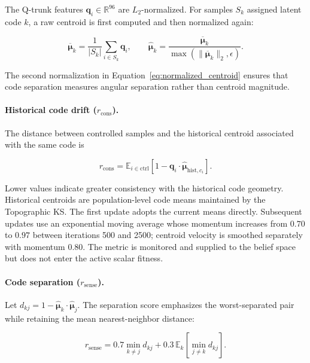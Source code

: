 The Q-trunk features $\mathbf{q}_i\in\mathbb{R}^{96}$ are $L_2$-normalized. For samples $S_k$ assigned latent code $k$, a raw centroid is first computed and then normalized again:

\begin{equation}
\overline{\boldsymbol{\mu}}_k
= \frac{1}{|S_k|}\sum_{i\in S_k}\mathbf{q}_i,
\qquad
\widehat{\boldsymbol{\mu}}_k
= \frac{\overline{\boldsymbol{\mu}}_k}
{\max(\|\overline{\boldsymbol{\mu}}_k\|_2,\epsilon)}.
\label{eq:normalized_centroid}
\end{equation}

The second normalization in Equation~\ref{eq:normalized_centroid} ensures that code separation measures angular separation rather than centroid magnitude.

\paragraph{Historical code drift ($r_{\text{cons}}$).}
The distance between controlled samples and the historical centroid associated with the same code is

\begin{equation}
r_{\text{cons}}
= \mathbb{E}_{i\in\text{ctrl}}
\left[1-\mathbf{q}_i\cdot
\widehat{\boldsymbol{\mu}}_{\text{hist},c_i}\right].
\end{equation}

Lower values indicate greater consistency with the historical code geometry. Historical centroids are population-level code means maintained by the Topographic KS. The first update adopts the current means directly. Subsequent updates use an exponential moving average whose momentum increases from $0.70$ to $0.97$ between iterations 500 and 2500; centroid velocity is smoothed separately with momentum $0.80$. The metric is monitored and supplied to the belief space but does not enter the active scalar fitness.

\paragraph{Code separation ($r_{\text{sense}}$).}
Let
$d_{kj}=1-\widehat{\boldsymbol{\mu}}_k\cdot
\widehat{\boldsymbol{\mu}}_j$. The separation score emphasizes the worst-separated pair while retaining the mean nearest-neighbor distance:

\begin{equation}
r_{\text{sense}}
= 0.7\min_{k\neq j}d_{kj}
+ 0.3\,\mathbb{E}_k\!\left[\min_{j\neq k}d_{kj}\right].
\end{equation}

